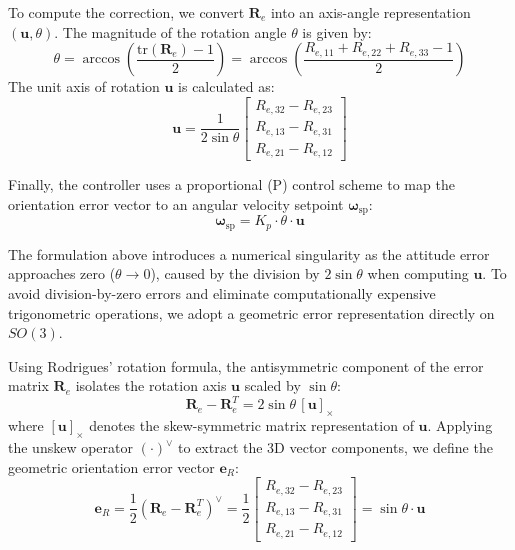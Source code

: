 \documentclass{article}
\begin{document}
	To compute the correction, we convert $\mathbf{R}_e$ into an axis-angle representation $(\mathbf{u}, \theta)$. The magnitude of the rotation angle $\theta$ is given by:
	\begin{equation*}
		\theta = \arccos\left(\frac{\text{tr}(\mathbf{R}_e) - 1}{2}\right) = \arccos\left(\frac{R_{e,11} + R_{e,22} + R_{e,33} - 1}{2}\right)
	\end{equation*}
	The unit axis of rotation $\mathbf{u}$ is calculated as:
	\begin{equation*}
		\mathbf{u} = \frac{1}{2\sin\theta} \begin{bmatrix} R_{e,32} - R_{e,23} \\ R_{e,13} - R_{e,31} \\ R_{e,21} - R_{e,12} \end{bmatrix}
	\end{equation*}
	
	Finally, the controller uses a proportional (P) control scheme to map the orientation error vector to an angular velocity setpoint $\bm{\omega}_{\text{sp}}$:
	\begin{equation*}
		\bm{\omega}_{\text{sp}} = K_p \cdot \theta \cdot \mathbf{u}
	\end{equation*}
	
	The formulation above introduces a numerical singularity as the attitude error approaches zero ($\theta \to 0$), caused by the division by $2\sin\theta$ when computing $\mathbf{u}$. To avoid division-by-zero errors and eliminate computationally expensive trigonometric operations, we adopt a geometric error representation directly on $SO(3)$.
	
	Using Rodrigues' rotation formula, the antisymmetric component of the error matrix $\mathbf{R}_e$ isolates the rotation axis $\mathbf{u}$ scaled by $\sin\theta$:
	\begin{equation*}
		\mathbf{R}_e - \mathbf{R}_e^T = 2\sin\theta \, [\mathbf{u}]_\times
	\end{equation*}
	where $[\mathbf{u}]_\times$ denotes the skew-symmetric matrix representation of $\mathbf{u}$. Applying the unskew operator $(\cdot)^\vee$ to extract the 3D vector components, we define the geometric orientation error vector $\mathbf{e}_R$:
	\begin{equation*}
		\mathbf{e}_R = \frac{1}{2} (\mathbf{R}_e - \mathbf{R}_e^T)^\vee = \frac{1}{2} \begin{bmatrix} R_{e,32} - R_{e,23} \\ R_{e,13} - R_{e,31} \\ R_{e,21} - R_{e,12} \end{bmatrix} = \sin\theta \cdot \mathbf{u}
	\end{equation*}
	
\end{document}
